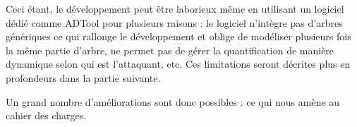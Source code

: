             Ceci étant, le développement peut être laborieux même en utilisant un logiciel dédié comme ADTool pour plusieurs raisons : le logiciel n’intègre pas d'arbres génériques ce qui rallonge le développement et oblige de modéliser plusieurs fois la même partie d'arbre, ne permet pas de gérer la quantification de manière dynamique selon qui est l'attaquant, etc. Ces limitations seront décrites plus en profondeurs dans la partie suivante.

            Un grand nombre d'améliorations sont donc possibles : ce qui nous amène au cahier des charges.
